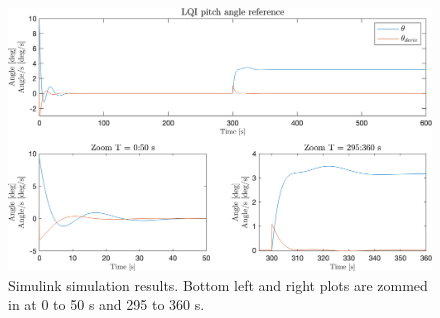 \begin{figure}[ht]
	\centering
	\includegraphics[width=0.7\linewidth]{Graphics/TestResults/linearModPerf/01_pitch.png}
	\caption{Simulink simulation results. Bottom left and right plots are zommed in at 0 to 50 s and 295 to 360 s.}
	\label{fig:01_pitch}
\end{figure}